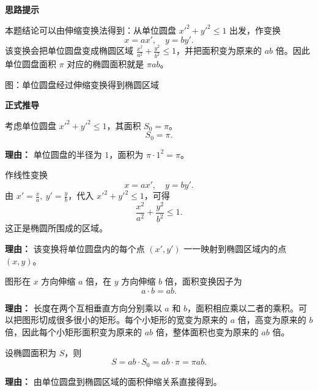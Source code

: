\begin{proofbox}
\textbf{\textcolor{CProof}{思路提示}}

本题结论可以由伸缩变换法得到：从单位圆盘 $x'^2+y'^2\le 1$ 出发，作变换
\[
    x=ax',\quad y=by'.
\]
该变换会把单位圆盘变成椭圆区域 $\frac{x^2}{a^2}+\frac{y^2}{b^2}\le 1$，并把面积变为原来的 $ab$ 倍。因此单位圆盘面积 $\pi$ 对应的椭圆面积就是 $\pi ab$。

\medskip
\begin{center}


\vspace{0.5em}
\small 图：单位圆盘经过伸缩变换得到椭圆区域
\end{center}

\textbf{\textcolor{CProof}{正式推导}}
\begin{description}[style=nextline, leftmargin=2.8em, labelsep=0.5em, itemsep=0.55em]
    \item[\textbf{步骤一（设定参照圆盘）：}] 考虑单位圆盘 $x'^2+y'^2\le 1$，其面积 $S_0=\pi$。
    \[
    S_0 = \pi.
    \]
    \par\textbf{理由：} 单位圆盘的半径为 $1$，面积为 $\pi\cdot 1^2=\pi$。

    \item[\textbf{步骤二（建立伸缩变换）：}] 作线性变换
    \[
    x = a x',\quad y = b y'.
    \]
    由 $x'=\frac{x}{a},\ y'=\frac{y}{b}$，代入 $x'^2+y'^2\le 1$，可得
    \[
    \frac{x^2}{a^2}+\frac{y^2}{b^2}\le 1.
    \]
    这正是椭圆所围成的区域。
    \par\textbf{理由：} 该变换将单位圆盘内的每个点 $(x',y')$ 一一映射到椭圆区域内的点 $(x,y)$。

    \item[\textbf{步骤三（面积变换因子）：}] 图形在 $x$ 方向伸缩 $a$ 倍，在 $y$ 方向伸缩 $b$ 倍，面积变换因子为
    \[
    a\cdot b=ab.
    \]
    \par\textbf{理由：} 长度在两个互相垂直方向分别乘以 $a$ 和 $b$，面积相应乘以二者的乘积。可以把图形切成很多很小的矩形。每个小矩形的宽变为原来的 $a$ 倍，高变为原来的 $b$ 倍，因此每个小矩形面积变为原来的 $ab$ 倍，整体面积也变为原来的 $ab$ 倍。

    \item[\textbf{步骤四（计算椭圆面积）：}] 设椭圆面积为 $S$，则
    \[
    S = ab\cdot S_0 = ab\cdot \pi = \pi ab.
    \]
    \par\textbf{理由：} 由单位圆盘到椭圆区域的面积伸缩关系直接得到。
\end{description}


\end{proofbox}

